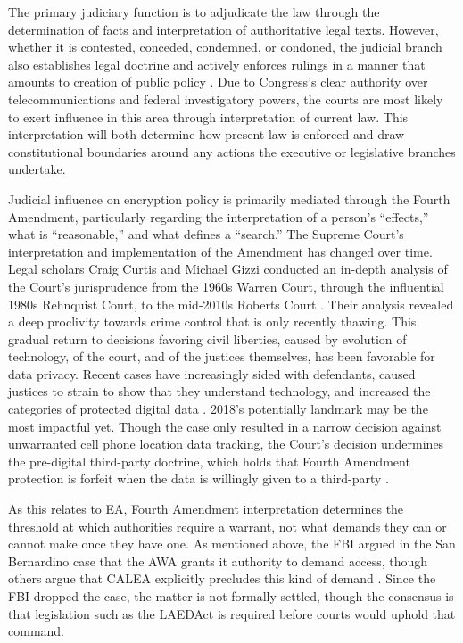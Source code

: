 The primary judiciary function is to adjudicate the law through the determination of facts and interpretation of
authoritative legal texts. However, whether it is contested, conceded, condemned, or condoned, the judicial branch also
establishes legal doctrine and actively enforces rulings in a manner that amounts to creation of public policy
\cite{feeley_judicial_2000}. Due to Congress's clear authority over telecommunications and federal investigatory powers,
the courts are most likely to exert influence in this area through interpretation of current law. This interpretation
will both determine how present law is enforced and draw constitutional boundaries around any actions the executive or
legislative branches undertake.

Judicial influence on encryption policy is primarily mediated through the Fourth Amendment, particularly regarding the
interpretation of a person's ``effects,'' what is ``reasonable,'' and what defines a ``search.'' The Supreme Court's
interpretation and implementation of the Amendment has changed over time. Legal scholars Craig Curtis and Michael Gizzi
conducted an in-depth analysis of the Court's jurisprudence from the 1960s Warren Court, through the influential 1980s
Rehnquist Court, to the mid-2010s Roberts Court \cite{gizzi_fourth_2016}. Their analysis revealed a deep proclivity
towards crime control that is only recently thawing. This gradual return to decisions favoring civil liberties, caused
by evolution of technology, of the court, and of the justices themselves, has been favorable for data privacy. Recent
cases have increasingly sided with defendants, caused justices to strain to show that they understand technology, and
increased the categories of protected digital data \cite{gizzi_fourth_2016}. 2018's potentially landmark  may be the most impactful yet. Though the case only resulted in a narrow decision against unwarranted
cell phone location data tracking, the Court's decision undermines the pre-digital third-party doctrine, which holds
that Fourth Amendment protection is forfeit when the data is willingly given to a third-party \cite{franklin_2018}.

As this relates to \ac{EA}, Fourth Amendment interpretation determines the threshold at which authorities require a
warrant, not what demands they can or cannot make once they have one. As mentioned above, the FBI argued in the San
Bernardino case that the \ac{AWA} grants it authority to demand access, though others argue that \acs{CALEA} explicitly
precludes this kind of demand \cite{gidari_2016}. Since the FBI dropped the case, the matter is not formally settled,
though the consensus is that legislation such as the \ac{LAEDAct} is required before courts would uphold that command.

